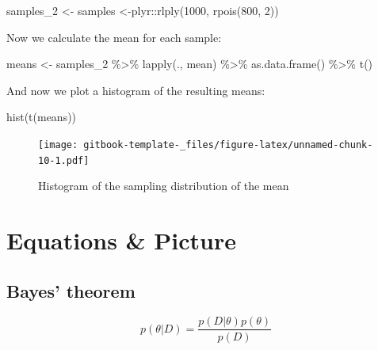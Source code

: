 \documentclass[
]{book}
\newenvironment{Shaded}{\begin{snugshade}}{\end{snugshade}}
\newcommand{\DecValTok}[1]{\textcolor[rgb]{0.00,0.00,0.81}{#1}}
\newcommand{\FunctionTok}[1]{\textcolor[rgb]{0.00,0.00,0.00}{#1}}
\newcommand{\NormalTok}[1]{#1}
\newcommand{\OtherTok}[1]{\textcolor[rgb]{0.56,0.35,0.01}{#1}}
\newcommand{\SpecialCharTok}[1]{\textcolor[rgb]{0.00,0.00,0.00}{#1}}
\begin{document}
\begin{Shaded}
\begin{Highlighting}[]
\NormalTok{samples\_2 }\OtherTok{\textless{}{-}}\NormalTok{ samples }\OtherTok{\textless{}{-}}\NormalTok{plyr}\SpecialCharTok{::}\FunctionTok{rlply}\NormalTok{(}\DecValTok{1000}\NormalTok{, }\FunctionTok{rpois}\NormalTok{(}\DecValTok{800}\NormalTok{, }\DecValTok{2}\NormalTok{))}
\end{Highlighting}
\end{Shaded}

Now we calculate the mean for each sample:

\begin{Shaded}
\begin{Highlighting}[]
\NormalTok{means }\OtherTok{\textless{}{-}}\NormalTok{ samples\_2 }\SpecialCharTok{\%\textgreater{}\%}
  \FunctionTok{lapply}\NormalTok{(., mean) }\SpecialCharTok{\%\textgreater{}\%}
  \FunctionTok{as.data.frame}\NormalTok{() }\SpecialCharTok{\%\textgreater{}\%}
  \FunctionTok{t}\NormalTok{()}
\end{Highlighting}
\end{Shaded}

And now we plot a histogram of the resulting means:

\begin{Shaded}
\begin{Highlighting}[]
\FunctionTok{hist}\NormalTok{(}\FunctionTok{t}\NormalTok{(means))}
\end{Highlighting}
\end{Shaded}

\begin{figure}
\centering
\texttt{[image: gitbook-template-\_files/figure-latex/unnamed-chunk-10-1.pdf]}
\caption{\label{fig:unnamed-chunk-10}Histogram of the sampling distribution of the mean}
\end{figure}

\hypertarget{equations-picture}{%
\chapter{Equations \& Picture}\label{equations-picture}}

\hypertarget{bayes-theorem}{%
\section{Bayes' theorem}\label{bayes-theorem}}

\begin{equation} 
p(\theta | D) = \frac{p(D|\theta) p(\theta)} {p(D)}
\label{eq:bayes}
\end{equation}
\end{document}
